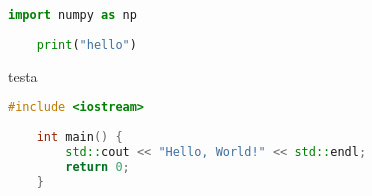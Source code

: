 \begin{lstlisting}[language=Python]
    import numpy as np
    
    print("hello")
    \end{lstlisting}
    testa
    \begin{lstlisting}[language=C++]
    #include <iostream>
    
    int main() {
        std::cout << "Hello, World!" << std::endl;
        return 0;
    }
    \end{lstlisting}
    